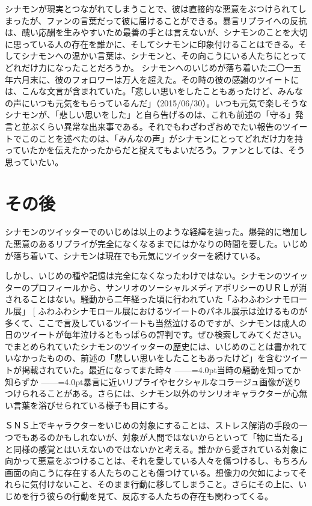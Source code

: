 \documentclass[b5j,twoside,twocolumn]{utarticle}
\makeatletter
\def\yakuchu{%
\@ifnextchar[\@xfootnote %
{\stepcounter{yakuchu}%
\protected@xdef\@thefnmark{\theyakuchu}%
\@footnotemark\@footnotetext}}
\makeatother
\begin{document}
シナモンが現実とつながれてしまうことで、彼は直接的な悪意をぶつけられてしまったが、ファンの言葉だって彼に届けることができる。暴言リプライへの反抗は、醜い応酬を生みやすいため最善の手とは言えないが、シナモンのことを大切に思っている人の存在を誰かに、そしてシナモンに印象付けることはできる。そしてシナモンへの温かい言葉は、シナモンと、その向こうにいる人たちにとってどれだけ力になったことだろうか。
シナモンへのいじめが落ち着いた二〇一五年六月末に、彼のフォロワーは万人を超えた。その時の彼の感謝のツイートには、こんな文言が含まれていた。「悲しい思いをしたこともあったけど、みんなの声にいつも元気をもらっているんだ」（2015/06/30）。いつも元気で楽しそうなシナモンが、「悲しい思いをした」と自ら告げるのは、これも前述の「守る」発言と並ぶくらい異常な出来事である。それでもわざわざおめでたい報告のツイートでこのことを述べたのは、「みんなの声」がシナモンにとってどれだけ力を持っていたかを伝えたかったからだと捉えてもよいだろう。ファンとしては、そう思っていたい。

\section*{その後}
シナモンのツイッターでのいじめは以上のような経緯を辿った。爆発的に増加した悪意のあるリプライが完全になくなるまでにはかなりの時間を要した。いじめが落ち着いて、シナモンは現在でも元気にツイッターを続けている。


しかし、いじめの種や記憶は完全になくなったわけではない。シナモンのツイッターのプロフィールから、サンリオのソーシャルメディアポリシーのＵＲＬが消されることはない。騒動から二年経った頃に行われていた「ふわふわシナモロール展」\yakuchu{ふわふわシナモロール展におけるツイートのパネル展示は泣けるものが多くて、ここで言及しているツイートも当然泣けるのですが、シナモンは成人の日のツイートが毎年泣けるともっぱらの評判です。ぜひ検索してみてください。}でまとめられていたシナモンのツイッターの歴史には、いじめのことは書かれていなかったものの、前述の「悲しい思いをしたこともあったけど」を含むツイートが掲載されていた。最近になってまた時々\tbaselineshift =2.5pt ------\tbaselineshift =4.0pt当時の騒動を知ってか知らずか\tbaselineshift =2.5pt ------\tbaselineshift =4.0pt暴言に近いリプライやセクシャルなコラージュ画像が送りつけられることがある。さらには、シナモン以外のサンリオキャラクターが心無い言葉を浴びせられている様子も目にする。


ＳＮＳ上でキャラクターをいじめの対象にすることは、ストレス解消の手段の一つでもあるのかもしれないが、対象が人間ではないからといって「物に当たる」と同様の感覚とはいえないのではないかと考える。誰かから愛されている対象に向かって悪意をぶつけることは、それを愛している人々を傷つけるし、もちろん画面の向こうに存在する人たちのことも傷つけている。想像力の欠如によってそれらに気付けないこと、そのまま行動に移してしまうこと。さらにその上に、いじめを行う彼らの行動を見て、反応する人たちの存在も関わってくる。
\end{document}
